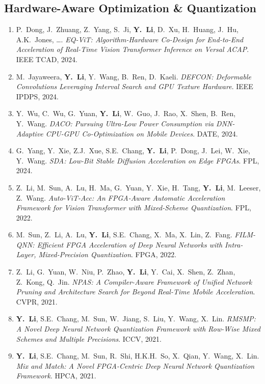 \documentclass[11pt,letterpaper]{article}
\newcommand{\pub}[4]{%
    \item #1. \textit{#2}. #3, #4.
}
\begin{document}
\subsection*{Hardware-Aware Optimization \& Quantization}

\begin{enumerate}[resume]

\pub{P.\ Dong, J.\ Zhuang, Z.\ Yang, S.\ Ji, \textbf{Y.\ Li}, D.\ Xu, H.\ Huang, J.\ Hu, A.K.\ Jones, \ldots}
    {EQ-ViT: Algorithm-Hardware Co-Design for End-to-End Acceleration of Real-Time Vision Transformer Inference on Versal ACAP}
    {IEEE TCAD}{2024}

\pub{M.\ Jayaweera, \textbf{Y.\ Li}, Y.\ Wang, B.\ Ren, D.\ Kaeli}
    {DEFCON: Deformable Convolutions Leveraging Interval Search and GPU Texture Hardware}
    {IEEE IPDPS}{2024}

\pub{Y.\ Wu, C.\ Wu, G.\ Yuan, \textbf{Y.\ Li}, W.\ Guo, J.\ Rao, X.\ Shen, B.\ Ren, Y.\ Wang}
    {DACO: Pursuing Ultra-Low Power Consumption via DNN-Adaptive CPU-GPU Co-Optimization on Mobile Devices}
    {DATE}{2024}

\pub{G.\ Yang, Y.\ Xie, Z.J.\ Xue, S.E.\ Chang, \textbf{Y.\ Li}, P.\ Dong, J.\ Lei, W.\ Xie, Y.\ Wang}
    {SDA: Low-Bit Stable Diffusion Acceleration on Edge FPGAs}
    {FPL}{2024}

\pub{Z.\ Li, M.\ Sun, A.\ Lu, H.\ Ma, G.\ Yuan, Y.\ Xie, H.\ Tang, \textbf{Y.\ Li}, M.\ Leeser, Z.\ Wang}
    {Auto-ViT-Acc: An FPGA-Aware Automatic Acceleration Framework for Vision Transformer with Mixed-Scheme Quantization}
    {FPL}{2022}

\pub{M.\ Sun, Z.\ Li, A.\ Lu, \textbf{Y.\ Li}, S.E.\ Chang, X.\ Ma, X.\ Lin, Z.\ Fang}
    {FILM-QNN: Efficient FPGA Acceleration of Deep Neural Networks with Intra-Layer, Mixed-Precision Quantization}
    {FPGA}{2022}

\pub{Z.\ Li, G.\ Yuan, W.\ Niu, P.\ Zhao, \textbf{Y.\ Li}, Y.\ Cai, X.\ Shen, Z.\ Zhan, Z.\ Kong, Q.\ Jin}
    {NPAS: A Compiler-Aware Framework of Unified Network Pruning and Architecture Search for Beyond Real-Time Mobile Acceleration}
    {CVPR}{2021}

\pub{\textbf{Y.\ Li}, S.E.\ Chang, M.\ Sun, W.\ Jiang, S.\ Liu, Y.\ Wang, X.\ Lin}
    {RMSMP: A Novel Deep Neural Network Quantization Framework with Row-Wise Mixed Schemes and Multiple Precisions}
    {ICCV}{2021}

\pub{\textbf{Y.\ Li}, S.E.\ Chang,  M.\ Sun, R.\ Shi, H.K.H.\ So, X.\ Qian, Y.\ Wang, X.\ Lin}
    {Mix and Match: A Novel FPGA-Centric Deep Neural Network Quantization Framework}
    {HPCA}{2021}

\end{enumerate}
\end{document}
